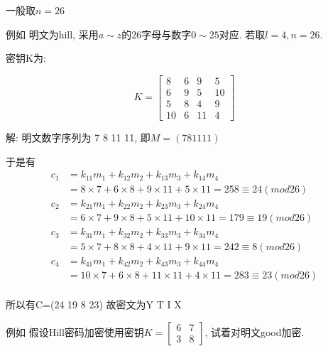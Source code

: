 \documentclass[UTF8]{ctexart}
\begin{document}
\begin{itemize}
\begin{enumerate}
            一般取$n=26$

            例如 明文为hill, 采用$a\sim z$的26字母与数字$0\sim 25$对应. 若取$l=4, n=26$.

            密钥K为:

            $$K=\left[ \begin{array}{cccc}{8} &{6} &{9} &{5}\\ {6} &{9} &{5} &{10}\\ {5} &{8} &{4} &{9}\\ {10} &{6} &{11} &{4}\end{array} \right]$$

            解: 明文数字序列为 7 8 11 11, 即$M=(7 8 11 11)$

            于是有
            \begin{equation}
                \begin{aligned}
                    c_1&=k_{11}m_1+k_{12}m_2+k_{13}m_3+k_{14}m_4\\
                    &=8\times 7+6\times 8+9\times 11+5\times 11=258\equiv 24(mod 26)\\
                    c_2&=k_{21}m_1+k_{22}m_2+k_{23}m_3+k_{24}m_4\\
                    &=6\times 7+9\times 8+5\times 11+10\times 11=179\equiv 19(mod 26)\\
                    c_3&=k_{31}m_1+k_{32}m_2+k_{33}m_3+k_{34}m_4\\
                    &=5\times 7+8\times 8+4\times 11+9\times 11=242\equiv 8(mod 26)\\
                    c_4&=k_{41}m_1+k_{42}m_2+k_{43}m_3+k_{44}m_4\\
                    &=10\times 7+6\times 8+11\times 11+4\times 11=283\equiv 23(mod 26)\\
                \end{aligned}
            \end{equation}

            所以有C=(24 19 8 23)
            故密文为Y T I X

            例如 假设Hill密码加密使用密钥$K=\left[ \begin{array}{cc}{6} &{7}\\ {3} &{8} \end{array}\right]$, 试着对明文good加密.


\end{enumerate}
\end{itemize}
\end{document}
